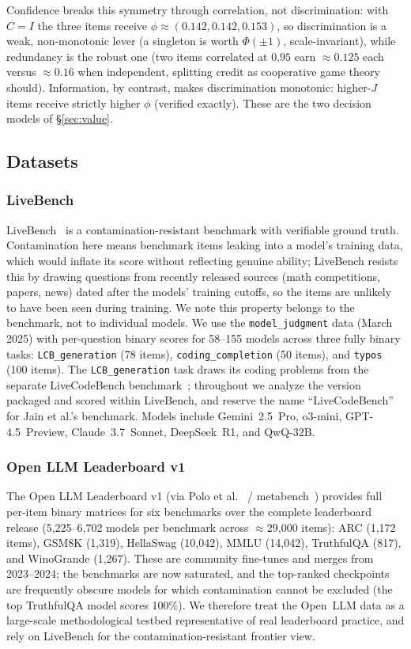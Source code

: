 \documentclass[conference]{IEEEtran}
\begin{document}
Confidence breaks this symmetry through correlation, not discrimination: with $C=I$ the three items receive $\phi\approx(0.142,0.142,0.153)$, so discrimination is a weak, non-monotonic lever (a singleton is worth $\Phi(\pm1)$, scale-invariant), while redundancy is the robust one (two items correlated at $0.95$ earn $\approx0.125$ each versus $\approx0.16$ when independent, splitting credit as cooperative game theory should).
Information, by contrast, makes discrimination monotonic: higher-$J$ items receive strictly higher $\phi$ (verified exactly).
These are the two decision models of \S\ref{sec:value}.

\subsection{Datasets}
\label{sec:datasets}

\subsubsection{LiveBench}
LiveBench~\cite{livebench} is a contamination-resistant benchmark with verifiable ground truth.
Contamination here means benchmark items leaking into a model's training data, which would inflate its score without reflecting genuine ability; LiveBench resists this by drawing questions from recently released sources (math competitions, papers, news) dated after the models' training cutoffs, so the items are unlikely to have been seen during training.
We note this property belongs to the benchmark, not to individual models.
We use the \texttt{model\_judgment} data (March 2025) with per-question binary scores for 58--155 models across three fully binary tasks: \texttt{LCB\_generation} (78 items), \texttt{coding\_completion} (50 items), and \texttt{typos} (100 items).
The \texttt{LCB\_generation} task draws its coding problems from the separate LiveCodeBench benchmark~\cite{jain2024livecodebench}; throughout we analyze the version packaged and scored within LiveBench, and reserve the name ``LiveCodeBench'' for Jain et al.'s benchmark.
Models include Gemini~2.5~Pro, o3-mini, GPT-4.5~Preview, Claude~3.7~Sonnet, DeepSeek~R1, and QwQ-32B.

\subsubsection{Open LLM Leaderboard v1}
The Open LLM Leaderboard v1 (via Polo et al.~\cite{polo2024tinybenchmarks} / metabench~\cite{kipnis2025metabench}) provides full per-item binary matrices for six benchmarks over the complete leaderboard release (5{,}225--6{,}702 models per benchmark across $\approx$29{,}000 items): ARC (1{,}172 items), GSM8K (1{,}319), HellaSwag (10{,}042), MMLU (14{,}042), TruthfulQA (817), and WinoGrande (1{,}267).
These are community fine-tunes and merges from 2023--2024; the benchmarks are now saturated, and the top-ranked checkpoints are frequently obscure models for which contamination cannot be excluded (the top TruthfulQA model scores 100\%).
We therefore treat the Open~LLM data as a large-scale methodological testbed representative of real leaderboard practice, and rely on LiveBench for the contamination-resistant frontier view.
\end{document}
